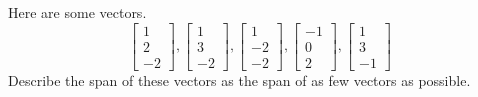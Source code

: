 \documentclass{ximera}
\begin{document}
\begin{problem}\label{prb:3.7} Here are some vectors.
\begin{equation*}
\left[
\begin{array}{r}
1 \\
2 \\
-2
\end{array}
\right] ,\left[
\begin{array}{r}
1 \\
3 \\
-2
\end{array}
\right] ,\left[
\begin{array}{r}
1 \\
-2 \\
-2
\end{array}
\right] ,\left[
\begin{array}{r}
-1 \\
0 \\
2
\end{array}
\right] ,\left[
\begin{array}{r}
1 \\
3 \\
-1
\end{array}
\right]
\end{equation*}
Describe the span of these vectors as the span of as few vectors as possible.
\end{problem}
\end{document}
